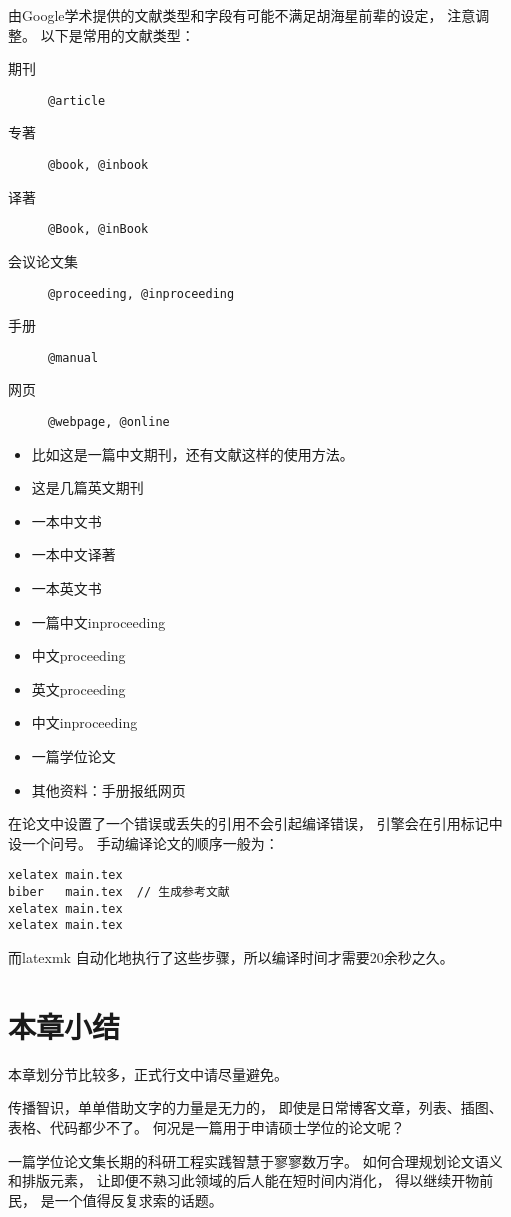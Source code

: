 由Google学术提供的文献类型和字段有可能不满足胡海星前辈的设定，
注意调整。
以下是常用的文献类型：
\begin{description}
    \item[期刊]          \texttt{@article}
    \item[专著]          \texttt{@book, @inbook}
    \item[译著]          \texttt{@Book, @inBook}
    \item[会议论文集]    \texttt{@proceeding, @inproceeding}
    \item[手册]          \texttt{@manual}
    \item[网页]          \texttt{@webpage, @online}
\end{description}

\begin{itemize}
    \item 比如这是一篇中文期刊\cite{lixiaodong1999}，还有文献这样的使用方法。
    \item 这是几篇英文期刊\cite{christine1998, kanamori1998}
    \item 一本中文书\cite{zh-book-1}
    \item 一本中文译著\cite{anwen1988b}
    \item 一本英文书\cite{lamport1994latex, takeuti1973}
    \item 一篇中文inproceeding\cite{nonlinear1996}
    \item 中文proceeding\cite{a2-1}
    \item 英文proceeding\cite{a2-2}
    \item 中文inproceeding\cite{aczel1998}
    \item 一篇学位论文\cite{a4-1} 
    \item 其他资料：手册\cite{ipad}报纸\cite{renminribao}网页\cite{dubash2010}
\end{itemize}

在论文中设置了一个错误或丢失的引用不会引起编译错误，
引擎会在引用标记中设一个问号。
手动编译论文的顺序一般为：
\begin{verbatim}
xelatex main.tex
biber   main.tex  // 生成参考文献
xelatex main.tex
xelatex main.tex
\end{verbatim}
而latexmk 自动化地执行了这些步骤，所以编译时间才需要20余秒之久。







\section{本章小结}

本章划分节比较多，正式行文中请尽量避免。

传播智识，单单借助文字的力量是无力的，
即使是日常博客文章，列表、插图、表格、代码都少不了。
何况是一篇用于申请硕士学位的论文呢？

一篇学位论文集长期的科研工程实践智慧于寥寥数万字。
如何合理规划论文语义和排版元素，
让即便不熟习此领域的后人能在短时间内消化，
得以继续开物前民，
是一个值得反复求索的话题。

